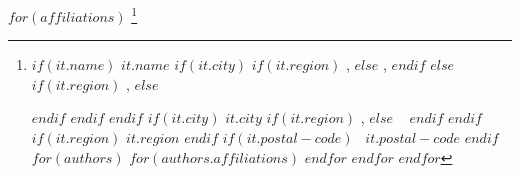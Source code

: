 $for(affiliations)$
\thanks[$it.id$]{
  $if(it.name)$
    $it.name$%
    $if(it.city)$
      $if(it.region)$
      ,
      $else$
      ,
      $endif$
    $else$
      $if(it.region)$
      ,
      $else$

      $endif$
    $endif$
  $endif$
  $if(it.city)$
    $it.city$%
    $if(it.region)$
      ,
    $else$
    \ %
    $endif$
  $endif$
  $if(it.region)$
    $it.region$%
  $endif$
  $if(it.postal-code)$
    \ $it.postal-code$%
  $endif$%
  $for(authors)$
    $for(authors.affiliations)$
      \expandafter\ifstrequal\expandafter{$it.ref$}{$affiliations.id$}{%
        $if(authors.email)$
        $if(authors.url)$
          \ (\email{$authors.email$}, \url{$authors.url$})%
        $else$
          \ (\email{$authors.email$})%
        $endif$
        $else$
          \ (\url{$authors.url$})%
        $endif$
       }{}%
    $endfor$
  $endfor$
$endfor$
}
